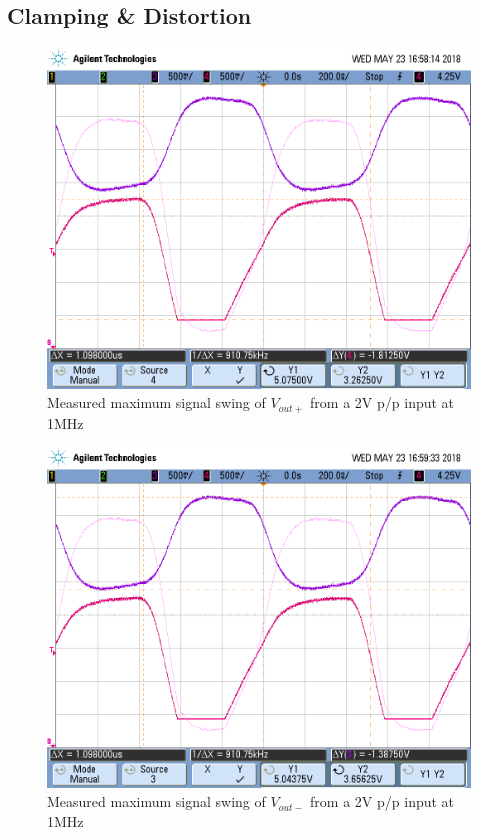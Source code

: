 \subsection{Clamping \& Distortion}

\FloatBarrier

\begin{figure}[h!]
	\centering
	\includegraphics[scale=0.60]{./images/scope_7}
	\caption{Measured maximum signal swing of $V_{out+}$ from a 2\si{\volt} p/p input at 1MHz}
	\label{fig:scope_7}
\end{figure}

\FloatBarrier

\begin{figure}[h!]
	\centering
	\includegraphics[scale=0.60]{./images/scope_8}
	\caption{Measured maximum signal swing of $V_{out-}$ from a 2\si{\volt} p/p input at 1MHz}
	\label{fig:scope_8}
\end{figure}

